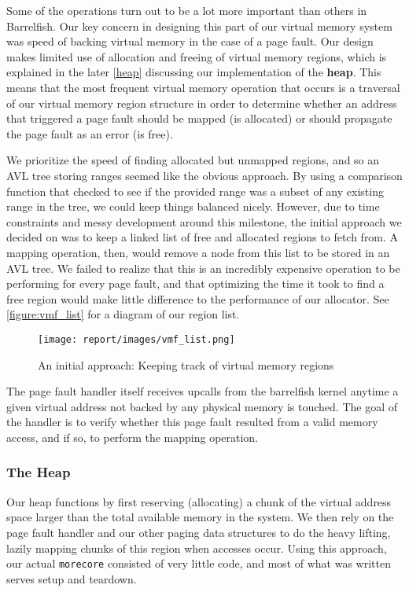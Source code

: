 Some of the operations turn out to be a lot more important than others in Barrelfish. Our key concern in designing this part of our virtual memory system was speed of backing virtual memory in the case of a page fault. Our design makes limited use of allocation and freeing of virtual memory regions, which is explained in the later \autoref{heap} discussing our implementation of the \textbf{heap}. This means that the most frequent virtual memory operation that occurs is a traversal of our virtual memory region structure in order to determine whether an address that triggered a page fault should be mapped (is allocated) or should propagate the page fault as an error (is free).

We prioritize the speed of finding allocated but unmapped regions, and so an AVL tree storing ranges seemed like the obvious approach. By using a comparison function that checked to see if the provided range was a subset of any existing range in the tree, we could keep things balanced nicely. However, due to time constraints and messy development around this milestone, the initial approach we decided on was to keep a linked list of free and allocated regions to fetch from. A mapping operation, then, would remove a node from this list to be stored in an AVL tree. We failed to realize that this is an incredibly expensive operation to be performing for every page fault, and that optimizing the time it took to find a free region would make little difference to the performance of our allocator. See \autoref{figure:vmf_list} for a diagram of our region list.


\begin{figure*}[h] 
	\texttt{[image: report/images/vmf\_list.png]}
	\caption{An initial approach: Keeping track of virtual memory regions}
	\label{figure:vmf_list}
	\centering
\end{figure*}

The page fault handler itself receives upcalls from the barrelfish kernel anytime a given virtual address not backed by any physical memory is touched. The goal of the handler is to verify whether this page fault resulted from a valid memory access, and if so, to perform the mapping operation.

\subsubsection*{The Heap} \label{heap}
Our heap functions by first reserving (allocating) a chunk of the virtual address space larger than the total available memory in the system. We then rely on the page fault handler and our other paging data structures to do the heavy lifting, lazily mapping chunks of this region when accesses occur. Using this approach, our actual \verb|morecore| consisted of very little code, and most of what was written serves setup and teardown.

